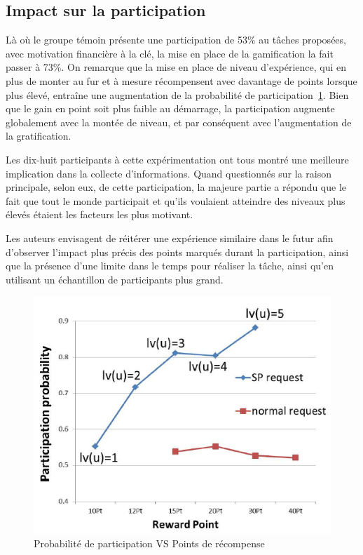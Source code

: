 \subsection{Impact sur la participation}
Là où le groupe témoin présente une participation de 53\% au tâches proposées, avec motivation financière à la clé, la mise en place de la gamification la fait passer à 73\%. On remarque que la mise en place de niveau d'expérience, qui en plus de monter au fur et à mesure récompensent avec davantage de points lorsque plus élevé, entraîne une augmentation de la probabilité de participation~\ref{fig:rewards}. Bien que le gain en point soit plus faible au démarrage, la participation augmente globalement avec la montée de niveau, et par conséquent avec l'augmentation de la gratification. \par

Les dix-huit participants à cette expérimentation ont tous montré une meilleure implication dans la collecte d'informations. Quand questionnés sur la raison principale, selon eux, de cette participation, la majeure partie a répondu que le fait que tout le monde participait et qu'ils voulaient atteindre des niveaux plus élevés étaient les facteurs les plus motivant. \par

Les auteurs envisagent de réitérer une expérience similaire dans le futur afin d'observer l'impact plus précis des points marqués durant la participation, ainsi que la présence d'une limite dans le temps pour réaliser la tâche, ainsi qu'en utilisant un échantillon de participants plus grand.


\begin{figure}
    \centering
    \includegraphics[width=0.7\linewidth]{Images/sensing-participation-figure.png}
    \caption{Probabilité de participation VS Points de récompense}
    \label{fig:rewards}
\end{figure}

